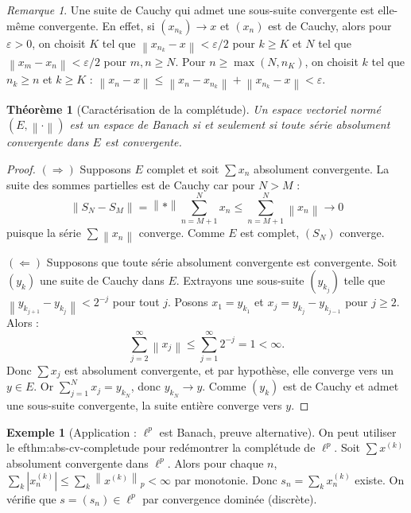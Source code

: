 \documentclass[a4paper,12pt]{book}
\newcommand{\norm}[1]{\left\| #1 \right\|}
\newcommand{\abs}[1]{\left| #1 \right|}
\theoremstyle{definition}
\newtheorem{exemple}[definition]{Exemple}
\theoremstyle{plain}
\newtheorem{theoreme}[definition]{Théorème}
\theoremstyle{remark}
\newtheorem{remarque}[definition]{Remarque}
\begin{document}
\begin{remarque}\label{rem:cv-sous-suite-cauchy}
Une suite de Cauchy qui admet une sous-suite convergente est elle-même convergente. En effet, si $(x_{n_k}) \to x$ et $(x_n)$ est de Cauchy, alors pour $\varepsilon > 0$, on choisit $K$ tel que $\norm{x_{n_k} - x} < \varepsilon/2$ pour $k \geq K$ et $N$ tel que $\norm{x_m - x_n} < \varepsilon/2$ pour $m, n \geq N$. Pour $n \geq \max(N, n_K)$, on choisit $k$ tel que $n_k \geq n$ et $k \geq K$ : $\norm{x_n - x} \leq \norm{x_n - x_{n_k}} + \norm{x_{n_k} - x} < \varepsilon$.
\end{remarque}

\begin{theoreme}[Caractérisation de la complétude]\label{thm:abs-cv-completude}
Un espace vectoriel normé $(E, \norm{\cdot})$ est un espace de Banach si et seulement si toute série absolument convergente dans $E$ est convergente.
\end{theoreme}

\begin{proof}
$(\Rightarrow)$ Supposons $E$ complet et soit $\sum x_n$ absolument convergente. La suite des sommes partielles est de Cauchy car pour $N > M$ :
\[
    \norm{S_N - S_M} = \norm*{\sum_{n=M+1}^{N} x_n} \leq \sum_{n=M+1}^{N} \norm{x_n} \to 0
\]
puisque la série $\sum \norm{x_n}$ converge. Comme $E$ est complet, $(S_N)$ converge.

$(\Leftarrow)$ Supposons que toute série absolument convergente est convergente. Soit $(y_k)$ une suite de Cauchy dans $E$. Extrayons une sous-suite $(y_{k_j})$ telle que $\norm{y_{k_{j+1}} - y_{k_j}} < 2^{-j}$ pour tout $j$. Posons $x_1 = y_{k_1}$ et $x_j = y_{k_j} - y_{k_{j-1}}$ pour $j \geq 2$. Alors :
\[
    \sum_{j=2}^{\infty} \norm{x_j} \leq \sum_{j=1}^{\infty} 2^{-j} = 1 < \infty.
\]
Donc $\sum x_j$ est absolument convergente, et par hypothèse, elle converge vers un $y \in E$. Or $\sum_{j=1}^{N} x_j = y_{k_N}$, donc $y_{k_N} \to y$. Comme $(y_k)$ est de Cauchy et admet une sous-suite convergente, la suite entière converge vers $y$.
\end{proof}

\begin{exemple}[Application : $\ell^p$ est Banach, preuve alternative]\label{ex:ell-p-banach-alt}
On peut utiliser le 
ef{thm:abs-cv-completude} pour redémontrer la complétude de $\ell^p$. Soit $\sum x^{(k)}$ absolument convergente dans $\ell^p$. Alors pour chaque $n$, $\sum_k \abs{x_n^{(k)}} \leq \sum_k \norm{x^{(k)}}_p < \infty$ par monotonie. Donc $s_n = \sum_k x_n^{(k)}$ existe. On vérifie que $s = (s_n) \in \ell^p$ par convergence dominée (discrète).
\end{exemple}
\end{document}
